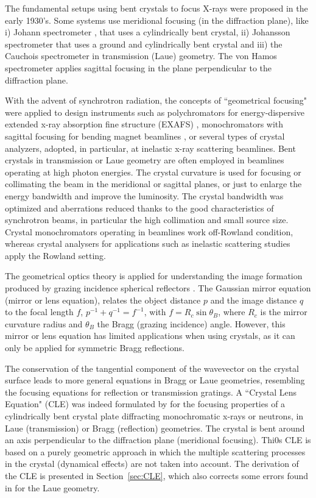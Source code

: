 \documentclass[preprint]{iucr}              %
\newcommand{\inred}[1]{{\color{red}#1}}
\begin{document}
The fundamental setups using bent crystals to focus X-rays were proposed in the early 1930’s. Some systems use meridional focusing (in the diffraction plane), like i) Johann spectrometer \cite{Johann1931}, that uses a cylindrically bent crystal,  ii) Johansson spectrometer \cite{Johansson1933} that uses a ground and cylindrically bent crystal and iii) the Cauchois spectrometer \cite{cauchois1933} in transmission (Laue) geometry. The von Hamos spectrometer \cite{V.Hamos1933} applies sagittal focusing in the plane perpendicular to the diffraction plane.

With the advent of synchrotron radiation, the concepts of ``geometrical focusing" were applied to design instruments such as polychromators for energy-dispersive extended x-ray absorption fine structure (EXAFS) \cite{Tolentino:ms0206}, monochromators with sagittal focusing for bending magnet beamlines \cite{Sparks1980}, or several types of crystal analyzers, adopted, in particular, at inelastic x-ray scattering beamlines. Bent crystals in transmission or Laue geometry are often employed in beamlines operating at high photon energies. The crystal curvature is used for focusing or collimating the beam in the meridional \cite{Suortti1988}\inred{\cite{SuorttiShulze}} or sagittal \cite{Zhong2001} planes, or just to enlarge the energy bandwidth and improve the luminosity. The crystal bandwidth was optimized and aberrations reduced thanks to the good characteristics of synchrotron beams, in particular the high collimation and small source size. Crystal monochromators operating in beamlines work off-Rowland condition, whereas crystal analysers for applications such as inelastic scattering studies apply the Rowland setting.

The geometrical optics theory is applied for understanding the image formation produced by grazing incidence spherical reflectors \cite{KB1948}. The Gaussian mirror equation (mirror or lens equation), relates the object distance $p$ and the image distance $q$ to the focal length $f$, $p^{-1}+q^{-1}=f^{-1}$, with $f=R_c \sin\theta_B$, where \inred{$R_c$} is the mirror curvature radius and $\theta_B$ the Bragg (grazing incidence) angle. However, this mirror or lens equation has limited applications when using crystals, as it can only be applied for symmetric Bragg reflections.

The conservation of the tangential component of the wavevector on the crystal surface leads to more general equations in Bragg or Laue geometries, resembling the focusing equations for reflection or transmission gratings.
A ``Crystal Lens Equation" (CLE) was indeed formulated by \cite{CK} for the focusing properties of a cylindrically bent crystal plate diffracting monochromatic x-rays or neutrons, in Laue (transmission) or Bragg (reflection) geometries. The crystal is bent around an axis perpendicular to the diffraction plane (meridional focusing). Thi0s CLE is based on a purely geometric approach in which the multiple scattering processes in the crystal (dynamical effects) are not taken into account. 
The derivation of the CLE is presented in Section~\ref{sec:CLE}, which also corrects
some errors found in \cite{CK} for the Laue geometry.
\end{document}
